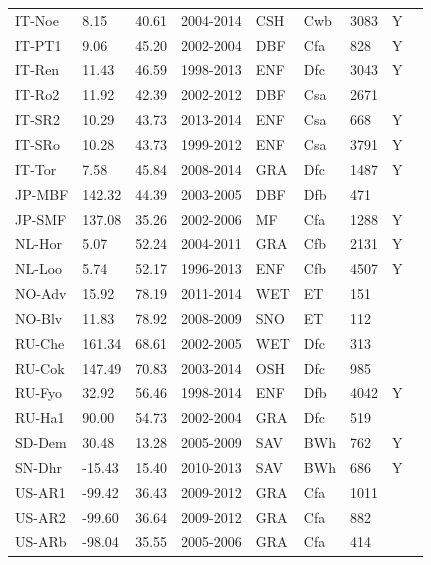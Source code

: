 \documentclass{myreport}
\begin{document}
\begin{longtable}{lllllllll}
  IT-Noe & 8.15 & 40.61 & 2004-2014 & CSH & Cwb & 3083 & Y & \citet{IT-Noe} \\ 
  IT-PT1 & 9.06 & 45.20 & 2002-2004 & DBF & Cfa & 828 & Y & \citet{IT-PT1} \\ 
  IT-Ren & 11.43 & 46.59 & 1998-2013 & ENF & Dfc & 3043 & Y & \citet{IT-Ren} \\ 
  IT-Ro2 & 11.92 & 42.39 & 2002-2012 & DBF & Csa & 2671 &  & \citet{IT-Ro2} \\ 
  IT-SR2 & 10.29 & 43.73 & 2013-2014 & ENF & Csa & 668 & Y & \citet{IT-SR2} \\ 
  IT-SRo & 10.28 & 43.73 & 1999-2012 & ENF & Csa & 3791 & Y & \citet{IT-SRo} \\ 
  IT-Tor & 7.58 & 45.84 & 2008-2014 & GRA & Dfc & 1487 & Y & \citet{IT-Tor} \\ 
  JP-MBF & 142.32 & 44.39 & 2003-2005 & DBF & Dfb & 471 &  & \citet{JP-MBF} \\ 
  JP-SMF & 137.08 & 35.26 & 2002-2006 & MF & Cfa & 1288 & Y & \citet{JP-SMF} \\ 
  NL-Hor & 5.07 & 52.24 & 2004-2011 & GRA & Cfb & 2131 & Y & \citet{NL-Hor} \\ 
  NL-Loo & 5.74 & 52.17 & 1996-2013 & ENF & Cfb & 4507 & Y & \citet{NL-Loo} \\ 
  NO-Adv & 15.92 & 78.19 & 2011-2014 & WET & ET & 151 &  & \citet{NO-Adv} \\ 
  NO-Blv & 11.83 & 78.92 & 2008-2009 & SNO & ET & 112 &  & \citet{NO-Blv} \\ 
  RU-Che & 161.34 & 68.61 & 2002-2005 & WET & Dfc & 313 &  & \citet{RU-Che} \\ 
  RU-Cok & 147.49 & 70.83 & 2003-2014 & OSH & Dfc & 985 &  & \citet{RU-Cok} \\ 
  RU-Fyo & 32.92 & 56.46 & 1998-2014 & ENF & Dfb & 4042 & Y & \citet{RU-Fyo} \\ 
  RU-Ha1 & 90.00 & 54.73 & 2002-2004 & GRA & Dfc & 519 &  & \citet{RU-Ha1} \\ 
  SD-Dem & 30.48 & 13.28 & 2005-2009 & SAV & BWh & 762 & Y & \citet{SD-Dem} \\ 
  SN-Dhr & -15.43 & 15.40 & 2010-2013 & SAV & BWh & 686 & Y & \citet{SN-Dhr} \\ 
  US-AR1 & -99.42 & 36.43 & 2009-2012 & GRA & Cfa & 1011 &  & \citet{US-AR1} \\ 
  US-AR2 & -99.60 & 36.64 & 2009-2012 & GRA & Cfa & 882 &  & \citet{US-AR2} \\ 
  US-ARb & -98.04 & 35.55 & 2005-2006 & GRA & Cfa & 414 &  & \citet{US-ARb} \\ 

\end{longtable}
\end{document}
